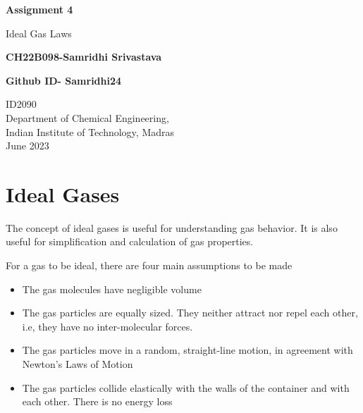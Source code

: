 \documentclass[16pt,a4paper]{article}
\begin{document}
\begin{titlepage}
    \begin{center}
        \vspace*{1cm}
        
        \Huge
        \textbf{Assignment 4}
        
        \vspace{0.5cm}
        \LARGE
        Ideal Gas Laws %
        
        \vspace{1.5cm}
        
        \textbf{CH22B098-Samridhi Srivastava}
   		  \vspace{1.5cm}
        
        \textbf{Github ID- Samridhi24}
       
        \vfill
        
        
        
        \vspace{0.8cm}
          \Large
	    ID2090\\
          Department of Chemical Engineering,\\
        Indian Institute of Technology, Madras\\
        June 2023
        
    \end{center}
\end{titlepage}








\section{Ideal Gases}
The concept of ideal gases is useful for understanding gas behavior. It is also useful for simplification and calculation of gas properties.


For a gas to be ideal, there are four main assumptions to be made ~\cite{doi:10.1021/ed045p351.1}
\begin{itemize}
    \item The gas molecules have negligible volume
    \item The gas particles are equally sized. They neither attract nor repel each other, i.e, they have no inter-molecular forces.
    \item The gas particles move in a random, straight-line motion, in agreement with Newton's Laws of Motion
    \item The gas particles collide elastically with the walls of the container and with each other. There is no energy loss 
\end{itemize}
\end{document}
